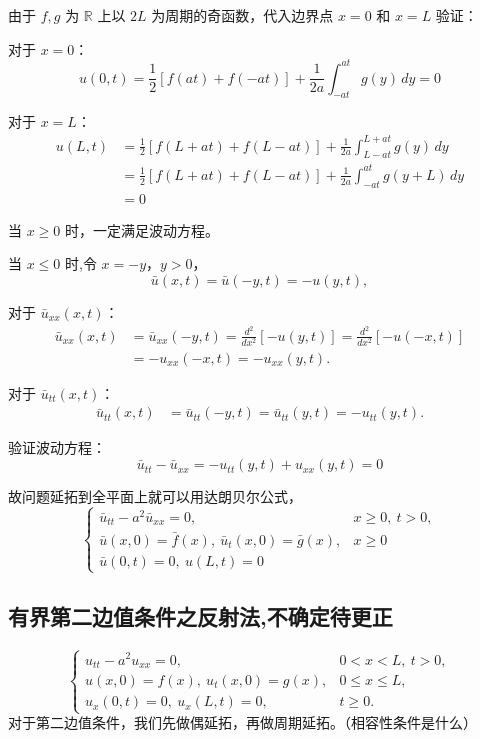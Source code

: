 \documentclass[12pt,a4paper]{article}
\numberwithin{subsection}{section}   %
\numberwithin{subsubsection}{subsection}
\theoremstyle{plain}
\theoremstyle{definition}
\theoremstyle{remark}
\theoremstyle{remark}
\begin{document}
由于 \(f, g\) 为 \(\mathbb{R}\) 上以 \(2L\) 为周期的奇函数，代入边界点 \(x = 0\) 和 \(x = L\) 验证：

对于 \(x = 0\)：
\begin{equation}
	u(0, t) = \frac{1}{2} \left[ f(at) + f(-at) \right] + \frac{1}{2a} \int_{-at}^{at} g(y) \, dy = 0
\end{equation}

对于 \(x = L\)：
\begin{equation}
	\begin{aligned}
		u(L, t) &= \frac{1}{2}[f(L + at) + f(L - at)] + \frac{1}{2a} \int_{L - at}^{L + at} g(y) \, dy \\
		&= \frac{1}{2}[f(L + at) + f(L - at)] + \frac{1}{2a} \int_{-at}^{at} g(y + L) \, dy \\
		&= 0
	\end{aligned}
\end{equation}

	当 \(x \geq 0\) 时，一定满足波动方程。

当 \(x \leq 0\) 时,令 \(x = -y\)，\(y > 0\)，
\[
\bar{u}(x, t) = \bar{u}(-y, t) = -u(y, t),
\]

对于 \(\bar{u}_{xx}(x, t)\)：
\[
\begin{aligned}
	\bar{u}_{xx}(x, t) &= \bar{u}_{xx}(-y, t) = \frac{d^2}{dx^2} [-u(y, t)] = \frac{d^2}{dx^2} [-u(-x, t)] \\
	&= -u_{xx}(-x, t) = -u_{xx}(y, t).
\end{aligned}
\]

对于 \(\bar{u}_{tt}(x, t)\)：
\[
\begin{aligned}
	\bar{u}_{tt}(x, t) &= \bar{u}_{tt}(-y, t) = \bar{u}_{tt}(y, t) = -u_{tt}(y, t).
\end{aligned}
\]

验证波动方程：
\[
\bar{u}_{tt} - \bar{u}_{xx} = -u_{tt}(y, t) + u_{xx}(y, t) = 0
\]

故问题延拓到全平面上就可以用达朗贝尔公式，
\begin{equation*}
	\begin{cases}
		\bar{u}_{tt} - a^2 \bar{u}_{xx} = 0, & x \geq  0 , \ t > 0, \\
		\bar{u}(x, 0) = \bar{f}(x), \ \bar{u}_t(x, 0) = \bar{g}(x), & x \geq  0 \\
		\bar{u}(0, t) = 0, \ u(L, t) = 0
	\end{cases}
\end{equation*}

\subsection{有界第二边值条件之反射法,不确定待更正}
	\begin{equation}
		\begin{cases}
			u_{tt} - a^2 u_{xx} = 0, & 0 < x < L, \ t > 0, \\
			u(x, 0) = f(x), \ u_t(x, 0) = g(x), & 0 \leq x \leq L, \\
			u_x(0, t) = 0, \ u_x(L, t) = 0, & t \geq 0.
		\end{cases}
	\end{equation}
	对于第二边值条件，我们先做偶延拓，再做周期延拓。（相容性条件是什么）
	
\end{document}
